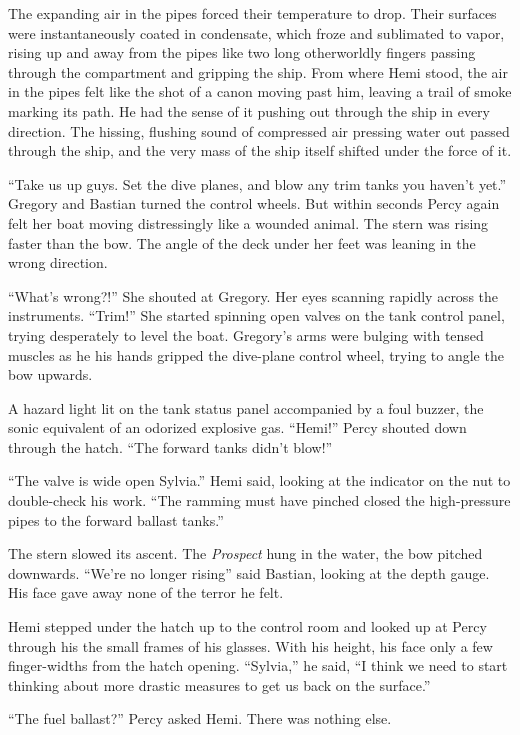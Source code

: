 \documentclass[]{article}
\begin{document}
\begin{multicols}{2}
The expanding air in the pipes forced their temperature to drop. Their
surfaces were instantaneously coated in condensate, which froze and
sublimated to vapor, rising up and away from the pipes like two long
otherworldly fingers passing through the compartment and gripping the
ship. From where Hemi stood, the air in the pipes felt like the shot of
a canon moving past him, leaving a trail of smoke marking its path. He
had the sense of it pushing out through the ship in every direction. The
hissing, flushing sound of compressed air pressing water out passed
through the ship, and the very mass of the ship itself shifted under the
force of it.

``Take us up guys. Set the dive planes, and blow any trim tanks you
haven't yet.'' Gregory and Bastian turned the control wheels. But within
seconds Percy again felt her boat moving distressingly like a wounded
animal. The stern was rising faster than the bow. The angle of the deck
under her feet was leaning in the wrong direction.

``What's wrong?!'' She shouted at Gregory. Her eyes scanning rapidly
across the instruments. ``Trim!'' She started spinning open valves on
the tank control panel, trying desperately to level the boat. Gregory's
arms were bulging with tensed muscles as he his hands gripped the
dive-plane control wheel, trying to angle the bow upwards.

A hazard light lit on the tank status panel accompanied by a foul
buzzer, the sonic equivalent of an odorized explosive gas. ``Hemi!''
Percy shouted down through the hatch. ``The forward tanks didn't blow!''

``The valve is wide open Sylvia.'' Hemi said, looking at the indicator
on the nut to double-check his work. ``The ramming must have pinched
closed the high-pressure pipes to the forward ballast tanks.''

The stern slowed its ascent. The \emph{Prospect} hung in the water, the
bow pitched downwards. ``We're no longer rising'' said Bastian, looking
at the depth gauge. His face gave away none of the terror he felt.

Hemi stepped under the hatch up to the control room and looked up at
Percy through his the small frames of his glasses. With his height, his
face only a few finger-widths from the hatch opening. ``Sylvia,'' he
said, ``I think we need to start thinking about more drastic measures to
get us back on the surface.''

``The fuel ballast?'' Percy asked Hemi. There was nothing else.


\end{multicols}
\end{document}
